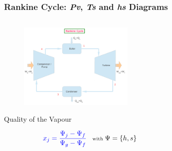 \documentclass[10pt,compress,handout,unknownkeysallowed]{beamer}
\begin{document}
\begin{frame}
 \frametitle{Rankine Cycle: {\it Pv}, {\it Ts} and {\it hs} Diagrams}
 \begin{columns}
%
   \begin{column}[l]{0.45\linewidth}
    \begin{figure}%
     \begin{center}
      \includegraphics[width=5.5cm,clip]{../Pics/Simple_Rankine_Cycle}
     \end{center}
    \end{figure} 
    \begin{block}{\begin{center}Quality of the Vapour\end{center}}
       \begin{displaymath}\scriptsize
         \textcolor{blue}{x_{j} = \displaystyle\frac{\Psi_{j}-\Psi_{f}}{\Psi_{g}-\Psi_{f}}} \;\;\;\text{with }\Psi=\left\{h,s\right\}
       \end{displaymath}
    \end{block}
   \end{column}
%
   \begin{column}[c]{0.55\linewidth}
    \begin{figure}%
     \begin{center}
     \end{center}
    \end{figure}  
   \end{column}
  \end{columns}
\end{frame}
\end{document}
